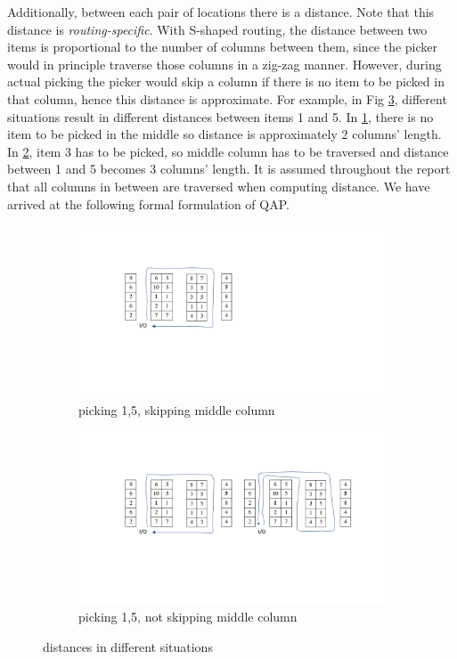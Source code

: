 \documentclass[hyp]{socreport}
\begin{document}
Additionally, between each pair of locations there is a distance. Note that this distance is \textit{routing-specific}. With S-shaped routing, the distance between two items is proportional to the number of columns between them, since the picker would in principle traverse those columns in a zig-zag manner. However, during actual picking the picker would skip a column if there is no item to be picked in that column, hence this distance is approximate. For example, in Fig \ref{fig:diffdist}, different situations result in different distances between items 1 and 5. In \ref{fig:routingskip}, there is no item to be picked in the middle so distance is approximately 2 columns' length. In \ref{fig:routingthrough}, item 3 has to be picked, so middle column has to be traversed and distance between 1 and 5 becomes 3 columns' length. It is assumed throughout the report that all columns in between are traversed when computing distance. We have arrived at the following formal formulation of QAP.

\begin{figure}
\begin{subfigure}{.5\textwidth}
\includegraphics[scale=0.5]{routing}
\centering
\caption{picking 1,5, skipping middle column}
\label{fig:routingskip}
\end{subfigure}
\begin{subfigure}{.5\textwidth}
\includegraphics[scale=0.5]{routing2}
\centering
\caption{picking 1,5, not skipping middle column}
\label{fig:routingthrough}
\end{subfigure}
\caption{distances in different situations}
\label{fig:diffdist}
\end{figure}
\end{document}
